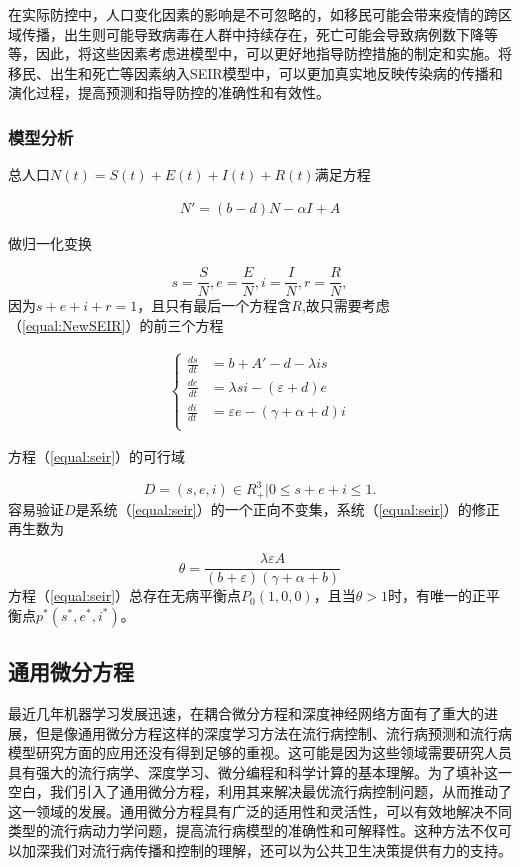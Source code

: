 在实际防控中，人口变化因素的影响是不可忽略的，如移民可能会带来疫情的跨区域传播，出生则可能导致病毒在人群中持续存在，死亡可能会导致病例数下降等等，因此，将这些因素考虑进模型中，可以更好地指导防控措施的制定和实施。将移民、出生和死亡等因素纳入SEIR模型中，可以更加真实地反映传染病的传播和演化过程，提高预测和指导防控的准确性和有效性。
\subsubsection{模型分析}
总人口$N(t)=S(t)+E(t)+I(t)+R(t)$满足方程

\begin{gather}
    N'=(b-d)N-\alpha I+A
    \label{equal:N'}
\end{gather}

做归一化变换

$$s=\frac{S}{N}, e=\frac{E}{N}, i=\frac{I}{N}, r=\frac{R}{N}, $$
因为$s+e+i+r=1$，且只有最后一个方程含$R$,故只需要考虑（\ref{equal:NewSEIR}）的前三个方程

\begin{gather}
    \left\{
    \begin{aligned}
    \frac{ds}{dt} & =  b + A'-d-\lambda is \\
    \frac{de}{dt} & =  \lambda si - (\varepsilon +d)e\\
    \frac{di}{dt} & =  \varepsilon e - (\gamma +\alpha +d)i\\
    \end{aligned}
    \right.
    \label{equal:seir}
\end{gather}

方程（\ref{equal:seir}）的可行域

$$D={(s,e,i)\in R^3_+|0\leqslant s+e+i\leqslant 1}.$$
容易验证$D$是系统（\ref{equal:seir}）的一个正向不变集，系统（\ref{equal:seir}）的修正再生数为

$$\theta =\frac{\lambda \varepsilon A}{(b+\varepsilon)(\gamma +\alpha +b) }$$
方程（\ref{equal:seir}）总存在无病平衡点$P_0(1,0,0)$，且当$\theta>1$时，有唯一的正平衡点$p^*(s^*,e^*,i^*)$。

\subsection{通用微分方程}
最近几年机器学习发展迅速，在耦合微分方程和深度神经网络方面有了重大的进展，但是像通用微分方程这样的深度学习方法在流行病控制、流行病预测和流行病模型研究方面的应用还没有得到足够的重视。这可能是因为这些领域需要研究人员具有强大的流行病学、深度学习、微分编程和科学计算的基本理解。为了填补这一空白，我们引入了通用微分方程，利用其来解决最优流行病控制问题，从而推动了这一领域的发展。通用微分方程具有广泛的适用性和灵活性，可以有效地解决不同类型的流行病动力学问题，提高流行病模型的准确性和可解释性。这种方法不仅可以加深我们对流行病传播和控制的理解，还可以为公共卫生决策提供有力的支持。

